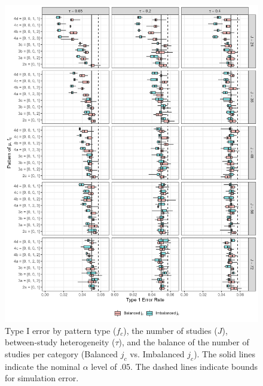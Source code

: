 \begin{figure}
    \centering
    \vspace{-5pt}\includegraphics[width=\linewidth]{chapters/plots/type1error_bal_tau.png}\caption{Type I error by pattern type ($f_c$), the number of studies ($J$), between-study heterogeneity ($\tau$), and the balance of the number of studies per category (Balanced $j_c$ vs. Imbalanced $j_c$). The solid lines indicate the nominal $\alpha$ level of $.05$. The dashed lines indicate bounds for simulation error. \label{fig: type1error_bal_tau}}
    \vspace{-5pt}
\end{figure}






